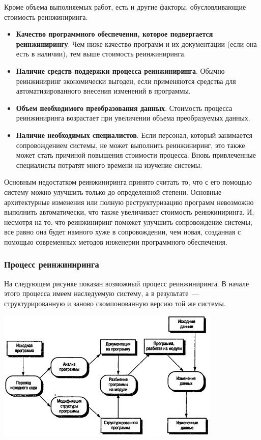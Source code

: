 \documentclass{../../text-style}
\begin{document}
Кроме объема выполняемых работ, есть и другие факторы, обусловливающие стоимость реинжиниринга.

\begin{itemize}
    \item \textbf{Качество программного обеспечения, которое подвергается реинжинирингу}. Чем ниже качество программ и их документации (если она есть в наличии), тем выше стоимость реинжиниринга.
    \item \textbf{Наличие средств поддержки процесса реинжиниринга}. Обычно реинжиниринг экономически выгоден, если применяются средства для автоматизированного внесения изменений в программы.
    \item \textbf{Объем необходимого преобразования данных}. Стоимость процесса реинжиниринга возрастает при увеличении объема преобразуемых данных.
    \item \textbf{Наличие необходимых специалистов}. Если персонал, который занимается сопровождением системы, не может выполнить реинжиниринг, это также может стать причиной повышения стоимости процесса. Вновь привлеченные специалисты потратят много времени на изучение системы.
\end{itemize}

Основным недостатком реинжиниринга принято считать то, что с его помощью систему можно улучшить только до определенной степени. Основные архитектурные изменения или полную реструктуризацию программ невозможно выполнить автоматически, что также увеличивает стоимость реинжиниринга. И, несмотря на то, что реинжиниринг поможет улучшить сопровождение системы, все равно она будет намного хуже в сопровождении, чем новая, созданная с помощью современных методов инженерии программного обеспечения.

\subsubsection{Процесс реинжиниринга}

На следующем рисунке показан возможный процесс реинжиниринга. В начале этого процесса имеем наследуемую систему, а в результате~--- структурированную и заново скомпонованную версию той же системы. 

\begin{center}
    \includegraphics[width=0.8\textwidth]{reengineeringProcess.png}
\end{center}
\end{document}
